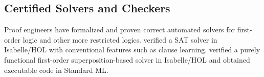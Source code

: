 
%

%
%
%

\subsection{Certified Solvers and Checkers}
\label{sec:solvers}

Proof engineers have formalized and proven correct automated solvers for first-order logic and other more restricted logics.
\cite{blanchette2018verified} verified a SAT solver in Isabelle/HOL with conventional features such as clause learning. \cite{schlichtkrull2019verified} verified a purely functional first-order superposition-based solver in Isabelle/HOL and obtained executable code in Standard ML.

